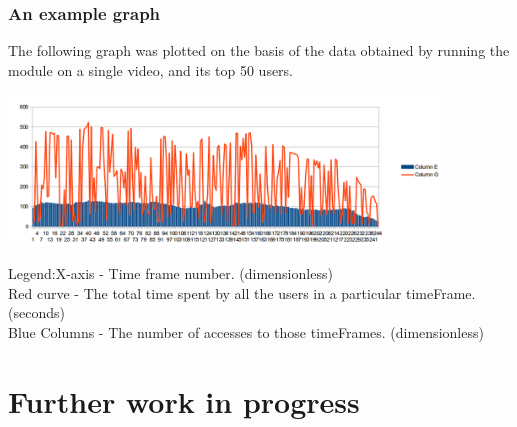 \documentclass[12pt,xcolor=dvipsnames]{beamer}
\begin{document}
\begin{frame}[t]
\frametitle{An example graph}

The following graph was plotted on the basis of the data obtained by running the module on a single video, and its top 50 users.

\begin{center}
\includegraphics[height=4cm]{Diag2.png}\\ %
\end{center}



\begin{tiny}

Legend:X-axis - Time frame number. (dimensionless)
\\Red curve - The total time spent by all the users in a particular timeFrame. (seconds)
\\Blue Columns - The number of accesses to those timeFrames. (dimensionless)\\
\end{tiny}

\end{frame}


\section{Further work in progress}
\end{document}
